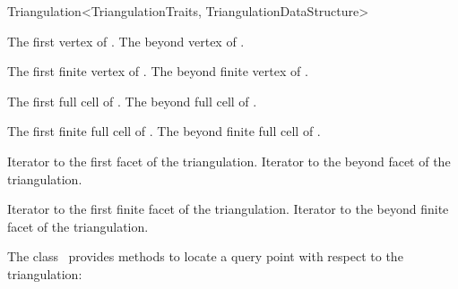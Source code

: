 \begin{ccRefClass}{Triangulation<TriangulationTraits, TriangulationDataStructure>}


{}
{The first vertex of \ccVar.}
\ccGlue{}
{The beyond vertex of \ccVar.}

{}
{The first finite vertex of \ccVar.}
\ccGlue{}
{The beyond finite vertex of \ccVar.}

{}
{The first full cell of \ccVar.}
\ccGlue{}
{The beyond full cell of \ccVar.}

{}
{The first finite full cell of \ccVar.}
\ccGlue{}
{The beyond finite full cell of \ccVar.}

{Iterator to the first facet of the triangulation.}
\ccGlue
{}
{Iterator to the beyond facet of the triangulation.}

{Iterator to the first finite facet of the triangulation.}
\ccGlue
{}
{Iterator to the beyond finite facet of the triangulation.}


The class \ccRefName\ provides methods to locate a query point with respect to
the triangulation:


\end{ccRefClass}
